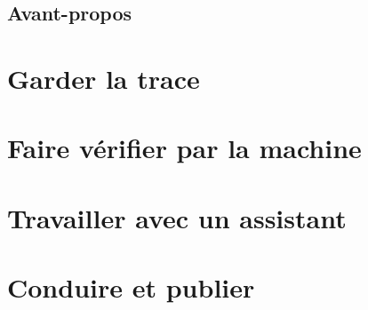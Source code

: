 



\couverture
\maketitle
\sloppy

\chapter*{Avant-propos}


\tableofcontents
\cleardoublepage

\part{Garder la trace}



\part{Faire vérifier par la machine}



\part{Travailler avec un assistant}







\part{Conduire et publier}






\appendix



\quatrieme


